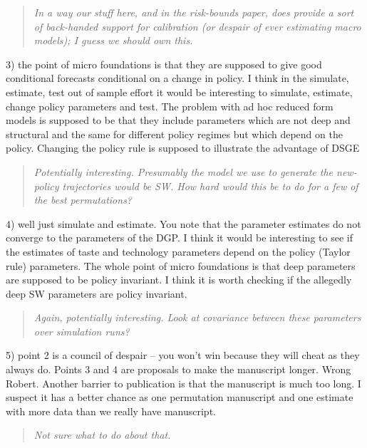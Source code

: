 \documentclass{article}
\begin{document}
\begin{quotation} {\em In a way our stuff here, and in the risk-bounds paper,
    does provide a sort of back-handed support for calibration (or despair of
    ever estimating macro models); I guess we should own this.}
\end{quotation}

3) the point of micro foundations is that they are supposed to give good conditional forecasts conditional on a change in policy.  I think in the simulate, estimate, test out of sample effort it would be interesting to simulate, estimate, change policy parameters and test.  The problem with ad hoc reduced form models is supposed to be that they include parameters which are not deep and structural and the same for different policy regimes but which depend on the policy.  Changing the policy rule is supposed to illustrate the advantage of DSGE

\begin{quotation} {\em Potentially interesting.  Presumably the model we use to
    generate the new-policy trajectories would be SW.  How hard would this be
    to do for a few of the best permutations?}
\end{quotation}


4) well just simulate and estimate.  You note that the parameter estimates do not converge to the parameters of the DGP.  I think it would be interesting to see if the estimates of taste and technology parameters depend on the policy (Taylor rule) parameters.  The whole point of micro foundations is that deep parameters are supposed to be policy invariant.  I think it is worth checking if the allegedly deep SW parameters are policy invariant.

\begin{quotation} {\em Again, potentially interesting.  Look at covariance
    between these parameters over simulation runs?}
\end{quotation}


5) point 2 is a council of despair -- you won't win because they will cheat as they always do.  Points 3 and 4 are proposals to make the manuscript longer. Wrong Robert.  Another barrier to publication is that the manuscript is much too long.  I suspect it has a better chance as one permutation manuscript and one estimate with more data than we really have manuscript.

\begin{quotation} {\em Not sure what to do about that.}
\end{quotation}
\end{document}
